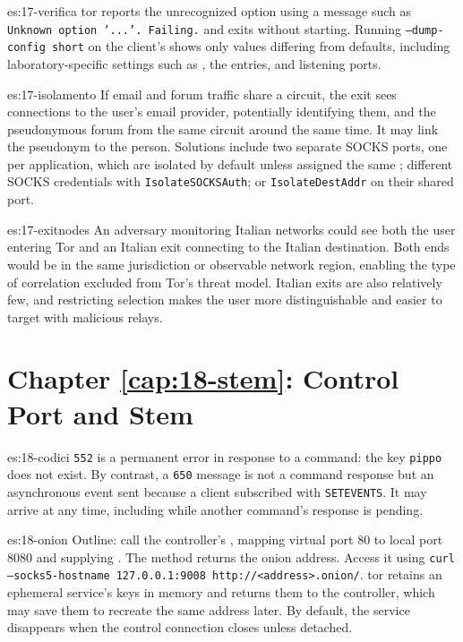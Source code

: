 \begin{soluzione}{es:17-verifica}
tor reports the unrecognized option using a message such as \texttt{Unknown option '...'. Failing.} and exits without starting. Running \texttt{--dump-config short} on the client's  shows only values differing from defaults, including laboratory-specific settings such as , the  entries, and listening ports.
\end{soluzione}

\begin{soluzione}{es:17-isolamento}
If email and forum traffic share a circuit, the exit sees connections to the user's email provider, potentially identifying them, and the pseudonymous forum from the same circuit around the same time. It may link the pseudonym to the person. Solutions include two separate SOCKS ports, one per application, which are isolated by default unless assigned the same ; different SOCKS credentials with \texttt{IsolateSOCKSAuth}; or \texttt{IsolateDestAddr} on their shared port.
\end{soluzione}

\begin{soluzione}{es:17-exitnodes}
An adversary monitoring Italian networks could see both the user entering Tor and an Italian exit connecting to the Italian destination. Both ends would be in the same jurisdiction or observable network region, enabling the type of correlation excluded from Tor's threat model. Italian exits are also relatively few, and restricting selection makes the user more distinguishable and easier to target with malicious relays.
\end{soluzione}

\section*{Chapter \ref{cap:18-stem}: Control Port and Stem}

\begin{soluzione}{es:18-codici}
\texttt{552} is a permanent error in response to a command: the key \texttt{pippo} does not exist. By contrast, a \texttt{650} message is not a command response but an asynchronous event sent because a client subscribed with \texttt{SETEVENTS}. It may arrive at any time, including while another command's response is pending.
\end{soluzione}

\begin{soluzione}{es:18-onion}
Outline: call the controller's , mapping virtual port 80 to local port 8080 and supplying . The method returns the onion address. Access it using \texttt{curl --socks5-hostname 127.0.0.1:9008 http://<address>.onion/}. tor retains an ephemeral service's keys in memory and returns them to the controller, which may save them to recreate the same address later. By default, the service disappears when the control connection closes unless detached.
\end{soluzione}

